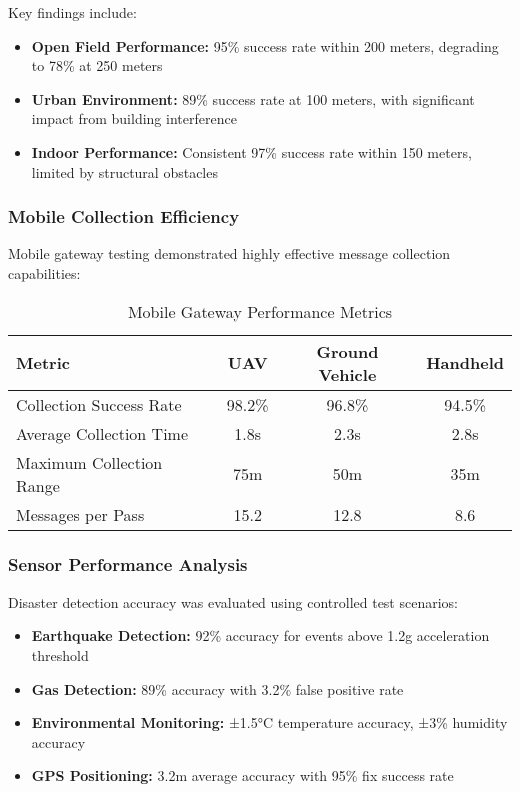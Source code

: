 \documentclass[conference]{IEEEtran}
\begin{document}
Key findings include:
\begin{itemize}
\item \textbf{Open Field Performance:} 95\% success rate within 200 meters, degrading to 78\% at 250 meters
\item \textbf{Urban Environment:} 89\% success rate at 100 meters, with significant impact from building interference
\item \textbf{Indoor Performance:} Consistent 97\% success rate within 150 meters, limited by structural obstacles
\end{itemize}

\subsubsection{Mobile Collection Efficiency}

Mobile gateway testing demonstrated highly effective message collection capabilities:

\begin{table}[htbp]
\centering
\caption{Mobile Gateway Performance Metrics}
\label{tab:mobile_performance}
\begin{tabular}{|l|c|c|c|}
\hline
\textbf{Metric} & \textbf{UAV} & \textbf{Ground Vehicle} & \textbf{Handheld} \\
\hline
Collection Success Rate & 98.2\% & 96.8\% & 94.5\% \\
\hline
Average Collection Time & 1.8s & 2.3s & 2.8s \\
\hline
Maximum Collection Range & 75m & 50m & 35m \\
\hline
Messages per Pass & 15.2 & 12.8 & 8.6 \\
\hline
\end{tabular}
\end{table}

\subsubsection{Sensor Performance Analysis}

Disaster detection accuracy was evaluated using controlled test scenarios:

\begin{itemize}
\item \textbf{Earthquake Detection:} 92\% accuracy for events above 1.2g acceleration threshold
\item \textbf{Gas Detection:} 89\% accuracy with 3.2\% false positive rate
\item \textbf{Environmental Monitoring:} ±1.5°C temperature accuracy, ±3\% humidity accuracy
\item \textbf{GPS Positioning:} 3.2m average accuracy with 95\% fix success rate
\end{itemize}
\end{document}

